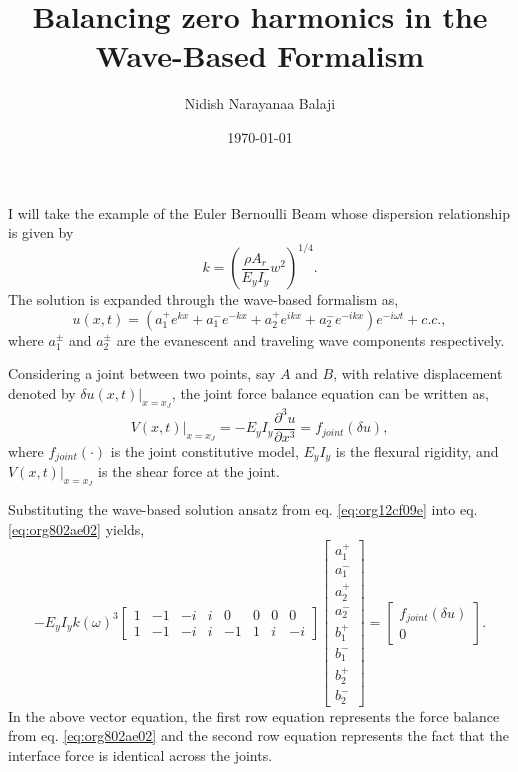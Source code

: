 \documentclass[11pt]{article}
\author{Nidish Narayanaa Balaji}
\date{\today}
\title{Balancing zero harmonics in the Wave-Based Formalism}
\begin{document}
\maketitle
I will take the example of the Euler Bernoulli Beam whose dispersion relationship is given by
\begin{equation}
\label{eq:org5c8404b}
k = {\left( \frac{\rho A_r}{E_y I_y} w^2 \right)}^{1/4}.
\end{equation}
The solution is expanded through the wave-based formalism as,
\begin{equation}
\label{eq:org12cf09e}
u(x,t) = (a_1^+ e^{kx} + a_1^- e^{-kx} + a_2^+ e^{ikx} + a_2^- e^{-ikx}) e^{-i\omega t} + c.c.,
\end{equation}
where \(a_1^{\pm}\) and \(a_2^{\pm}\) are the evanescent and traveling wave components respectively. 

Considering a joint between two points, say \(A\) and \(B\), with relative displacement denoted by \(\delta u(x,t)\rvert_{x=x_J}\), the joint force balance equation can be written as,
\begin{equation}
\label{eq:org802ae02}
V(x,t)\rvert_{x=x_J} = -E_y I_y \frac{\partial^3 u}{\partial x^3} = f_{joint} (\delta u ),
\end{equation}
where \(f_{joint}(\cdot)\) is the joint constitutive model, \(E_yI_y\) is the flexural rigidity, and \(V(x,t)\rvert_{x=x_J}\) is the shear force at the joint.

Substituting the wave-based solution ansatz from eq. \ref{eq:org12cf09e} into eq. \ref{eq:org802ae02} yields,
\begin{equation}
\label{eq:org3f11885}
-E_y I_y k(\omega)^3 \begin{bmatrix} 1 & -1 & -i & i & 0 & 0 & 0 & 0\\
1 & -1 & -i & i & -1 & 1 & i & -i \end{bmatrix}
\begin{bmatrix} a_1^+\\ a_1^-\\ a_2^+\\ a_2^-\\ b_1^+\\ b_1^-\\ b_2^+\\ b_2^- \end{bmatrix} =
\begin{bmatrix} f_{joint}(\delta u)\\ 0 \end{bmatrix}.
\end{equation}
In the above vector equation, the first row equation represents the force balance from eq. \ref{eq:org802ae02} and the second row equation represents the fact that the interface force is identical across the joints.
\end{document}
